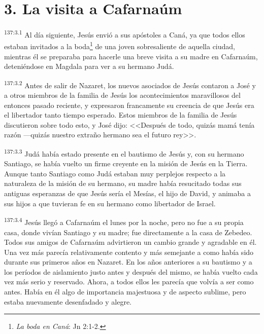 \section*{3. La visita a Cafarnaúm}
\par 
\textsuperscript{137:3.1} Al día siguiente, Jesús envió a sus apóstoles a Caná, ya que todos ellos estaban invitados a la boda\footnote{\textit{La boda en Caná}: Jn 2:1-2.} de una joven sobresaliente de aquella ciudad, mientras él se preparaba para hacerle una breve visita a su madre en Cafarnaúm, deteniéndose en Magdala para ver a su hermano Judá.

\par 
\textsuperscript{137:3.2} Antes de salir de Nazaret, los nuevos asociados de Jesús contaron a José y a otros miembros de la familia de Jesús los acontecimientos maravillosos del entonces pasado reciente, y expresaron francamente su creencia de que Jesús era el libertador tanto tiempo esperado. Estos miembros de la familia de Jesús discutieron sobre todo esto, y José dijo: <<Después de todo, quizás mamá tenía razón ---quizás nuestro extraño hermano sea el futuro rey>>.

\par 
\textsuperscript{137:3.3} Judá había estado presente en el bautismo de Jesús y, con su hermano Santiago, se había vuelto un firme creyente en la misión de Jesús en la Tierra. Aunque tanto Santiago como Judá estaban muy perplejos respecto a la naturaleza de la misión de su hermano, su madre había resucitado todas sus antiguas esperanzas de que Jesús sería el Mesías, el hijo de David, y animaba a sus hijos a que tuvieran fe en su hermano como libertador de Israel.

\par 
\textsuperscript{137:3.4} Jesús llegó a Cafarnaúm el lunes por la noche, pero no fue a su propia casa, donde vivían Santiago y su madre; fue directamente a la casa de Zebedeo. Todos sus amigos de Cafarnaúm advirtieron un cambio grande y agradable en él. Una vez más parecía relativamente contento y más semejante a como había sido durante sus primeros años en Nazaret. En los años anteriores a su bautismo y a los períodos de aislamiento justo antes y después del mismo, se había vuelto cada vez más serio y reservado. Ahora, a todos ellos les parecía que volvía a ser como antes. Había en él algo de importancia majestuosa y de aspecto sublime, pero estaba nuevamente desenfadado y alegre.

